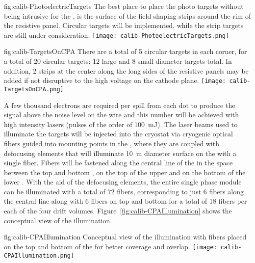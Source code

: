 \begin{dunefigure}{fig:calib-PhotoelectricTargets}
{The best place to place the photo targets without being intrusive for the \efield, is the surface of the field shaping strips around the rim of the resistive panel. Circular targets will be implemented, while the strip targets are still under consideration.}
\texttt{[image: calib-PhotoelectricTargets.png]} 
\end{dunefigure}

\begin{dunefigure}{fig:calib-TargetsOnCPA}
{There are a total of 5 circular targets in each corner, for a total of 20 circular targets: 12 large and 8 small diameter targets total. In addition, 2 strips at the center along the long sides of the resistive panels may be added if not disruptive to the high voltage on the cathode plane.} 
\texttt{[image: calib-TargetsOnCPA.png]} 
\end{dunefigure}

A few thousand electrons are required per spill from each dot to produce the signal above the noise level on the wire and this number will be achieved with high intensity lasers (pulses of the order of \SI{100}{\milli\joule}). The laser beams used to illuminate the targets will be injected into the cryostat via cryogenic optical fibers guided into mounting points in the , where they are coupled with defocusing elements that will illuminate \SI{10}{\m} diameter surface on the   with a single fiber. Fibers will be fastened along the central line of the  in the space between the top and bottom , on the top of the upper  and on the bottom of the lower . With the aid of the defocusing elements, the entire single phase module can be illuminated with a total of \num{72} fibers, corresponding to just \num{6} fibers along the central line along with \num{6} fibers on top and bottom for a total of \num{18} fibers per each of the four drift volumes. Figure~\ref{fig:calib-CPAIllumination} shows the conceptual view of the  illumination.

\begin{dunefigure}{fig:calib-CPAIllumination}
{Conceptual view of the  illumination with fibers placed on the top and bottom of the  for better coverage and overlap.} 
\texttt{[image: calib-CPAIllumination.png]} 
\end{dunefigure}

